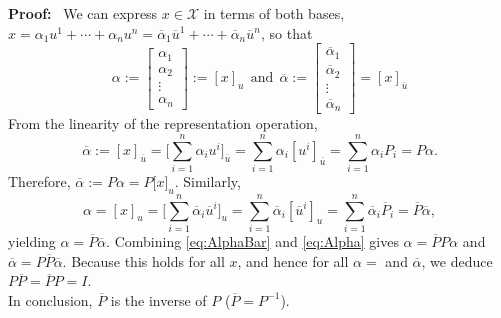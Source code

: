 \textbf{Proof:}~ We can express $x \in \mathcal{X}$ in terms of both bases,   $x=\alpha_1u^1+\dotsb+\alpha_nu^n=\overline{\alpha}_1\overline{u}^1+\dotsb+\overline{\alpha}_n\overline{u}^n$, so that
$$
        \alpha:=\begin{bmatrix}\alpha_{1}\\
            \alpha_{2}\\
            \vdots\\
            \alpha_{n}
        \end{bmatrix}:=[x]_{u} ~~\text{and}~~
        \overline{\alpha}:=\begin{bmatrix}\overline{\alpha}_{1}\\
            \overline{\alpha}_{2}\\
            \vdots\\
            \overline{\alpha}_{n}
        \end{bmatrix}=[x]_{\overline{u}}
$$
From the linearity of the representation operation, 
\begin{equation}
\label{eq:AlphaBar}
    \overline{\alpha}:=[x]_{\overline{u}}=\Big[ \displaystyle\sum_{i=1}^{n}\alpha_{i}u^{i}\Big]_{\overline{u}}=\displaystyle\sum_{i=1}^{n}\alpha_{i}[u^{i}]_{\overline{u}}=\displaystyle\sum_{i=1}^{n}\alpha_{i} P_{i}=P\alpha.
\end{equation}
Therefore, $\overline{\alpha} := P\alpha = P{[}x{]}_{u}$. Similarly, 
\begin{equation}
\label{eq:Alpha}
\alpha=[x]_{u}=\Big[ \displaystyle\sum_{i=1}^{n}\overline{\alpha}_{i} \overline{u}^{i}\Big]_{u}=\displaystyle\sum_{i=1}^{n}\overline{\alpha}_{i}[\overline{u}^{i}]_{u}=\displaystyle\sum_{i=1}^{n}\overline{\alpha}_{i} \overline{P}_{i}=\overline{P}\overline{\alpha},
\end{equation}
yielding $\alpha=\overline{P}\overline{\alpha}$. Combining \eqref{eq:AlphaBar} and \eqref{eq:Alpha} gives $\alpha=\overline{P}P\alpha$ and $\overline{\alpha}=P\overline{P}\overline{\alpha}$. Because this holds for all $x$, and hence for all $\alpha=$ and $\overline{\alpha}$, we deduce $P\overline{P} = \overline{P}P = I$.\\

    In conclusion, $\overline{P}$ is the inverse of $P$ ($ \overline{P}=P^{-1}$). 
    \Qed

\vspace*{.2in}

